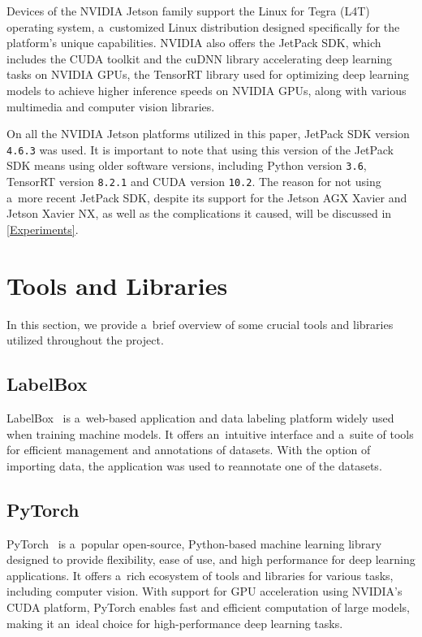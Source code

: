 Devices of the NVIDIA Jetson family support the Linux for Tegra (L4T) operating
system, a~customized Linux distribution designed specifically for the platform's
unique capabilities. NVIDIA also offers the JetPack SDK, which includes the
CUDA toolkit and the cuDNN library accelerating deep learning tasks on NVIDIA
GPUs, the TensorRT library used for optimizing deep learning models to achieve
higher inference speeds on NVIDIA GPUs, along with various multimedia and
computer vision libraries.

On all the NVIDIA Jetson platforms utilized in this paper, JetPack SDK version
\texttt{4.6.3} was used. It is important to note that using this version of the
JetPack SDK means using older software versions, including Python version
\texttt{3.6}, TensorRT version \texttt{8.2.1} and CUDA version \texttt{10.2}.
The reason for not using a~more recent JetPack SDK, despite its support for the
Jetson AGX Xavier and Jetson Xavier NX, as well as the complications it caused,
will be discussed in \autoref{Experiments}.


\section{Tools and Libraries}

In this section, we provide a~brief overview of some crucial tools and
libraries utilized throughout the project.


\subsection{LabelBox}

LabelBox~\cite{LabelBox} is a~web-based application and data labeling platform
widely used when training machine models. It offers an~intuitive interface and
a~suite of tools for efficient management and annotations of datasets. With the
option of importing data, the application was used to reannotate one of the
datasets.


\subsection{PyTorch}

PyTorch~\cite{PyTorch} is a~popular open-source, Python-based machine learning
library designed to provide flexibility, ease of use, and high performance for
deep learning applications. It offers a~rich ecosystem of tools and libraries for
various tasks, including computer vision. With support for GPU acceleration
using NVIDIA's CUDA platform, PyTorch enables fast and efficient computation of
large models, making it an~ideal choice for high-performance deep learning
tasks.


